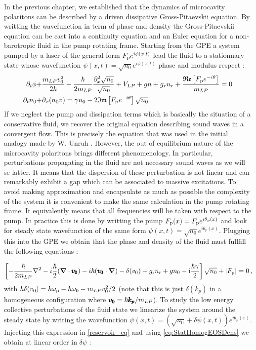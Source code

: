 In the previous chapter, we established that the dynamics of microcavity polaritons can be described by a driven dissipative Gross-Pitaevskii equation.
By writting the wavefunction in term of phase and density the Gross-Pitaevskii equation can be cast into a continuity equation and an Euler equation for a non-barotropic fluid in the pump rotating frame. Starting from the GPE
a system pumped by a laser of the general form $F_{\mathrm{p}}e^{i\phi(x,t)}$ lead the fluid to a stationnary state whose wavefunction $\psi(x,t)=\sqrt{n_0}e^{i\phi(x,t)}$ phase and modulus respect :
\begin{equation}
    \begin{align}
    \partial_t \phi +& \frac{m_{LP} v_0^2}{2\hbar}+\frac{\hbar}{2m_{LP}}\frac{\partial_x^2\sqrt{n_0}}{\sqrt{n_0}}+V_{LP}+gn+g_rn_r+\frac{\mathfrak{Re}\left[F_{\mathrm{p}}e^{-i\theta}\right]}{m_{LP}}=0\,\\
    \partial_t n_0 +& \partial_x(n_0v)= \gamma n_0 -2\mathfrak{Im}\left[F_{\mathrm{p}}e^{-i\theta}\right]\sqrt{n_0}
    \end{align}
\end{equation}
If we neglect the pump and dissipation terms which is basically the situation of a conservative fluid, we recover the original equation describing 
sound waves in a convergent flow. This is precisely the equation that was used in the initial analogy made by W. Unruh \cite{unruh_experimental_1981}.
However, the out of equilibrium nature of the microcavity polaritons brings different phenomenology. In particular, perturbations propagating in
the fluid are not necessary sound waves as we will se latter. It means that the dispersion of these perturbation is not linear and 
can remarkably exhibit a gap which can be associated to massive excitations. To avoid making approximation and encapsulate as much as possible 
the complexity of the system it is convenient to make the same calculation in the pump rotating frame. It equivalently means that all frequencies
will be taken with respect to the pump. In practice this is done by writting the pump $F_{\mathrm{p}}(x)= F_{\mathrm{p}}e^{i\theta_p(x)}$ and look for steady state wavefunction 
of the same form $\psi(x,t)=\sqrt{n_0}e^{i\theta_p(x)}$. Plugging this into the GPE we obtain that the phase and density of the fluid must fullfill the following equations :

\begin{equation}
    \left[-\frac{\hbar}{2m_{LP}}\nabla^2-i\frac{\hbar}{2}(\boldsymbol{\nabla}\cdot\pmb{v_0}) -i\hbar(\pmb{v_0}\cdot\boldsymbol{\nabla})- \delta(v_0)+g_{\rm r}n_{\rm r}+g n_0-\mathrm{i}\frac{\hbar\gamma}{2}\right]\sqrt{n_0}+|F_{\mathrm{p}}|=0\,,
        \label{eq:StatHomogEOSDens}
\end{equation}
with $\hbar \delta(v_0)=\hbar\omega_{\mathrm{p}}-\hbar\omega_0-m_{LP} v_0^2/2$ (note that this is just $\delta(k_p)$ in a homogeneous configuration where $\pmb{v_0}=\hbar\pmb{k_p}/m_{LP}$).
To study the low energy collective perturbations of the fluid state we linearize the system around the steady state by writing the wavefunction
$\psi(x,t)=(\sqrt{n_0}+\delta\psi(x,t))e^{i\theta_p(x)}$. Injecting this expression in \autoref{reservoir_eq} and using \autoref{eq:StatHomogEOSDens} we obtain at linear order in $\delta\psi$ :


